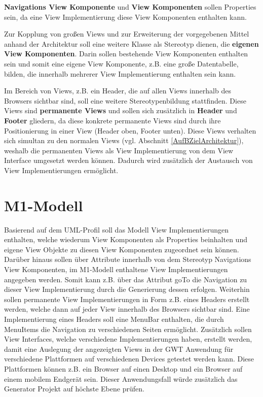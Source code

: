 \textbf{Navigations View Komponente} und \textbf{View Komponenten} sollen 
Properties sein, da eine View Implementierung diese View Komponenten enthalten
kann.

Zur Kopplung von großen Views und zur Erweiterung der vorgegebenen Mittel anhand
der Architektur soll eine weitere Klasse als Stereotyp dienen, die
\textbf{eigenen View Komponenten}. Darin sollen bestehende View Komponenten
enthalten sein und somit eine eigene View Komponente, z.B. eine große
Datentabelle, bilden, die innerhalb mehrerer View Implementierung enthalten sein
kann.

Im Bereich von Views, z.B. ein Header, die auf allen Views innerhalb des
Browsers sichtbar sind, soll eine weitere Stereotypenbildung stattfinden. Diese Views
sind \textbf{permanente Views} und sollen sich zusätzlich in \textbf{Header} und
\textbf{Footer} gliedern, da diese konkrete permanente Views sind durch
ihre Positionierung in einer View (Header oben, Footer unten). Diese Views
verhalten sich simultan zu den normalen Views (vgl. Abschnitt \ref{AufBZielArchitektur}),
weshalb die permanenten Views als View Implementierung von dem View Interface umgesetzt werden können.
Dadurch wird zusätzlich der Austausch von View Implementierungen ermöglicht.
\section{M1-Modell}\label{AufBM1}
Basierend auf dem UML-Profil soll das Modell View Implementierungen enthalten,
welche wiederum View Komponenten als Properties beinhalten und eigene
View Objekte zu diesen View Komponenten zugeordnet sein können. Darüber hinaus
sollen über Attribute innerhalb von dem Stereotyp Navigations View Komponenten,
im M1-Modell enthaltene View Implementierungen angegeben werden. Somit kann z.B. über das Attribut goTo
die Navigation zu dieser View Implementierung durch die Generierung
dessen erfolgen.
Weiterhin sollen permanente View Implementierungen in Form z.B. eines
Headers erstellt werden, welche dann auf jeder View innerhalb des Browsers
sichtbar sind. Eine Implementierung eines Headers soll eine MenuBar enthalten,
die durch MenuItems die Navigation zu verschiedenen Seiten ermöglicht.
Zusätzlich sollen View Interfaces, welche verschiedene
Implementierungen haben, erstellt werden, damit eine Auslegung der
angezeigten Views in der GWT Anwendung für verschiedene Plattformen auf
verschiedenen Devices getestet werden kann. Diese Plattformen können z.B.
ein Browser auf einen Desktop und ein Browser auf einem mobilem Endgerät sein.
Dieser Anwendungsfall würde zusätzlich das Generator Projekt auf höchste Ebene 
prüfen.
